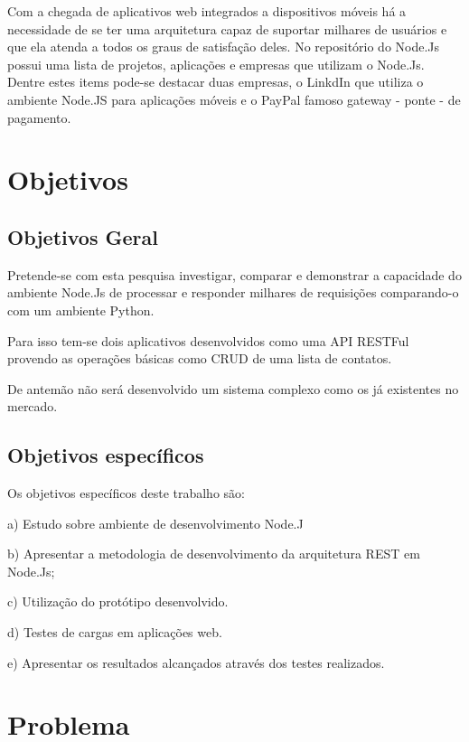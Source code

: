   Com a chegada de aplicativos web integrados a dispositivos móveis há a necessidade de se ter
  uma arquitetura capaz de suportar milhares de usuários e que ela atenda a todos os graus de satisfação deles. 
  No repositório do Node.Js possui uma lista de projetos, aplicações e empresas que utilizam o Node.Js. 
  Dentre estes items pode-se destacar duas empresas, o LinkdIn que utiliza o ambiente Node.JS para aplicações 
  móveis e o PayPal famoso gateway - ponte - de pagamento.
  
\section{Objetivos}
\label{objetivos}

\subsection{Objetivos Geral}

  Pretende-se com esta pesquisa investigar, comparar e demonstrar a capacidade 
  do ambiente Node.Js de processar e responder milhares de requisições comparando-o com um ambiente Python.
  
  Para isso tem-se dois aplicativos desenvolvidos como uma API RESTFul provendo as operações
  básicas como \ac{CRUD} de uma lista de contatos.
  
  De antemão não será desenvolvido um sistema complexo como os já existentes no mercado.
  
\subsection{Objetivos específicos}

  Os objetivos específicos deste trabalho são:
  
    \begin{compactitem}
      \item[a)] Estudo sobre ambiente de desenvolvimento Node.J
      \item[b)] Apresentar a metodologia de desenvolvimento da arquitetura REST em Node.Js;
      \item[c)] Utilização do protótipo desenvolvido.
      \item[d)] Testes de cargas em aplicações web.
      \item[e)] Apresentar os resultados alcançados através dos testes realizados.
    \end{compactitem}
  
\section{Problema}
\label{problema}

